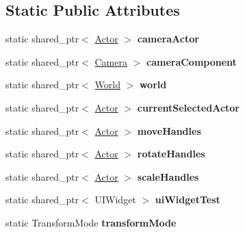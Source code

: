 \subsection*{Static Public Attributes}
\begin{DoxyCompactItemize}
\item 
\hypertarget{class_editor_a9987cc7ae7fb52189734079b80eab220}{}static shared\+\_\+ptr$<$ \hyperlink{class_actor}{Actor} $>$ {\bfseries camera\+Actor}\label{class_editor_a9987cc7ae7fb52189734079b80eab220}

\item 
\hypertarget{class_editor_a7b66261f82c8365732054171784725cc}{}static shared\+\_\+ptr$<$ \hyperlink{class_camera}{Camera} $>$ {\bfseries camera\+Component}\label{class_editor_a7b66261f82c8365732054171784725cc}

\item 
\hypertarget{class_editor_af478b09e584532e9de994255394a7ba6}{}static shared\+\_\+ptr$<$ \hyperlink{class_world}{World} $>$ {\bfseries world}\label{class_editor_af478b09e584532e9de994255394a7ba6}

\item 
\hypertarget{class_editor_a11095b5f6f42d73b6572e59225d616ed}{}static shared\+\_\+ptr$<$ \hyperlink{class_actor}{Actor} $>$ {\bfseries current\+Selected\+Actor}\label{class_editor_a11095b5f6f42d73b6572e59225d616ed}

\item 
\hypertarget{class_editor_a2bb668ff0442c826055eea8996afec0e}{}static shared\+\_\+ptr$<$ \hyperlink{class_actor}{Actor} $>$ {\bfseries move\+Handles}\label{class_editor_a2bb668ff0442c826055eea8996afec0e}

\item 
\hypertarget{class_editor_a08dcbe3de2ae85741f28748ed92335e5}{}static shared\+\_\+ptr$<$ \hyperlink{class_actor}{Actor} $>$ {\bfseries rotate\+Handles}\label{class_editor_a08dcbe3de2ae85741f28748ed92335e5}

\item 
\hypertarget{class_editor_a6ae097c81fc7631122e2be5a5c3d7ae5}{}static shared\+\_\+ptr$<$ \hyperlink{class_actor}{Actor} $>$ {\bfseries scale\+Handles}\label{class_editor_a6ae097c81fc7631122e2be5a5c3d7ae5}

\item 
\hypertarget{class_editor_a9169638c34360328cbbb6f731bb1b3ea}{}static shared\+\_\+ptr$<$ U\+I\+Widget $>$ {\bfseries ui\+Widget\+Test}\label{class_editor_a9169638c34360328cbbb6f731bb1b3ea}

\item 
\hypertarget{class_editor_a5d3ea528bdefe9cd342bccc6a6ab3af3}{}static Transform\+Mode {\bfseries transform\+Mode}\label{class_editor_a5d3ea528bdefe9cd342bccc6a6ab3af3}

\end{DoxyCompactItemize}


